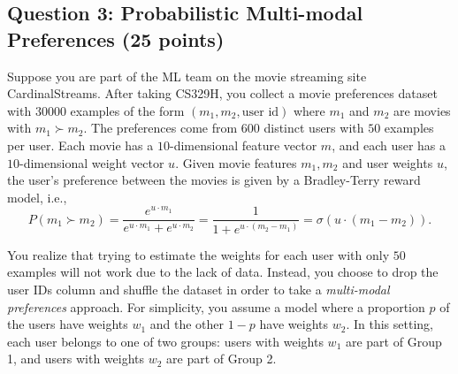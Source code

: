 \documentclass[
  letterpaper,
  numbers=noenddot,
  DIV=11]{scrreprt}
\theoremstyle{definition}
\theoremstyle{plain}
\theoremstyle{plain}
\theoremstyle{remark}
\begin{document}
\subsection*{Question 3: Probabilistic Multi-modal Preferences (25
points)}\label{question-3-probabilistic-multi-modal-preferences-25-points}

Suppose you are part of the ML team on the movie streaming site
CardinalStreams. After taking CS329H, you collect a movie preferences
dataset with \(30000\) examples of the form
\((m_1, m_2, \text{user id})\) where \(m_1\) and \(m_2\) are movies with
\(m_1\succ m_2\). The preferences come from \(600\) distinct users with
\(50\) examples per user. Each movie has a \(10\)-dimensional feature
vector \(m\), and each user has a \(10\)-dimensional weight vector
\(u\). Given movie features \(m_1, m_2\) and user weights \(u\), the
user's preference between the movies is given by a Bradley-Terry reward
model, i.e.,
\[P(m_1\succ m_2)=\frac{e^{u\cdot m_1}}{e^{u\cdot m_1} + e^{u\cdot m_2}}=\frac{1}{1+e^{u\cdot (m_2-m_1)}}=\sigma(u\cdot (m_1-m_2)).\]

You realize that trying to estimate the weights for each user with only
\(50\) examples will not work due to the lack of data. Instead, you
choose to drop the user IDs column and shuffle the dataset in order to
take a \emph{multi-modal preferences} approach. For simplicity, you
assume a model where a proportion \(p\) of the users have weights
\(w_1\) and the other \(1-p\) have weights \(w_2\). In this setting,
each user belongs to one of two groups: users with weights \(w_1\) are
part of Group 1, and users with weights \(w_2\) are part of Group 2.
\end{document}

